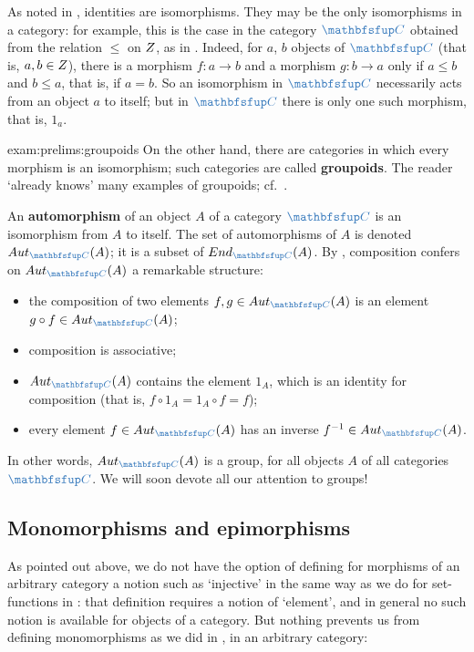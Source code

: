 \begin{exam}{}{}
  As noted in , identities are
  isomorphisms. They may be the only isomorphisms in a category: for
  example, this is the case in the category $\categ{C}$ obtained from
  the relation $\leq$ on $Z$, as in
  . Indeed, for $a$, $b$ objects of
  $\categ{C}$ (that is, $a, b \in Z$), there is a morphism
  $f \colon a \to b$ and a morphism $g \colon b \to a$ only if
  $a \leq b$ and $b \leq a$, that is, if $a = b$. So an isomorphism in
  $\categ{C}$ necessarily acts from an object $a$ to itself; but in
  $\categ{C}$ there is only one such morphism, that is, $1_a$.
\end{exam}

\begin{exam}{}{exam:prelims:groupoids}
  On the other hand, there are categories in which every morphism is
  an isomorphism; such categories are called \textbf{groupoids}. The
  reader `already knows' many examples of groupoids; cf.\
  .
\end{exam}

An \textbf{automorphism} of an object $A$ of a category $\categ{C}$ is
an isomorphism from $A$ to itself. The set of automorphisms of $A$ is
denoted $\Aut_{\categ{C}}(A)$; it is a subset of
$\End_{\categ{C}}(A)$. By , composition
confers on $\Aut_{\categ{C}}(A)$ a remarkable structure:
\begin{itemize}
\item the composition of two elements $f, g \in \Aut_{\categ{C}}(A)$
  is an element $g \circ f \in \Aut_{\categ{C}}(A)$;
\item composition is associative;
\item $\Aut_{\categ{C}}(A)$ contains the element $1_A$, which is an
  identity for composition (that is, $f \circ 1_A = 1_A \circ f = f$);
\item every element $f \in \Aut_{\categ{C}}(A)$ has an inverse
  $f^{-1} \in \Aut_{\categ{C}}(A)$.
\end{itemize}
In other words, $\Aut_{\categ{C}}(A)$ is a group, for all objects $A$
of all categories $\categ{C}$. We will soon devote all our attention
to groups!

\subsection{Monomorphisms and epimorphisms}%
\label{subsec:prelims:morphisms:monomorphisms-and-epimorphisms}
As pointed out above, we do not have the option of defining for
morphisms of an arbitrary category a notion such as `injective' in the
same way as we do for set-functions in
: that
definition requires a notion of `element', and in general no such
notion is available for objects of a category. But nothing prevents us
from defining monomorphisms as we did in
, in
an arbitrary category:

